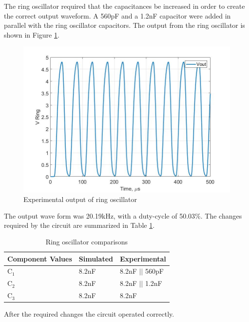
The ring oscillator required that the capacitances be increased in order to create the correct output waveform. A 560pF and a 1.2nF capacitor were added in parallel with the ring oscillator capacitors. The output from the ring oscillator is shown in Figure \ref{fig:vringout}.

\begin{figure}[H]
	\centering
	\includegraphics[width=0.6\linewidth]{ExperimentalImplementation/vring_out}
	\caption[Experimental ring output]{Experimental output of ring oscillator}
	\label{fig:vringout}
\end{figure}

The output wave form was 20.19kHz, with a duty-cycle of 50.03\%. The changes required by the circuit are summarized in Table \ref{tab:expvaluering}.

\begin{table}[H]
	\centering
	\caption{Ring oscillator comparisons}
	\label{tab:expvaluering}
	\begin{tabular}{|l|l|l|}
		\hline
		Component Values & Simulated & Experimental   \\ \hline
		C$_1$            & 8.2nF     & 8.2nF $||$ 560pF \\ \hline
		C$_2$            & 8.2nF     & 8.2nF $||$ 1.2nF \\ \hline
		C$_3$            & 8.2nF     & 8.2nF          \\ \hline
	\end{tabular}
\end{table}

After the required changes the circuit operated correctly.


